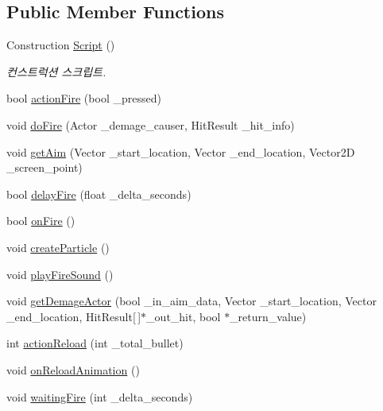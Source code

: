\subsection*{Public Member Functions}
\begin{DoxyCompactItemize}
\item 
Construction \hyperlink{class_weapons___actor_a47da85d09a9191edbee8f5454f8a5118}{Script} ()
\begin{DoxyCompactList}\small\item\em 컨스트럭션 스크립트. \end{DoxyCompactList}\item 
bool \hyperlink{class_weapons___actor_a386d7f1cdcdd6f989cbd91a4612094c9}{action\+Fire} (bool \+\_\+pressed)
\item 
void \hyperlink{class_weapons___actor_ab19a4d70050baea3347948f457b4316f}{do\+Fire} (Actor \+\_\+demage\+\_\+causer, Hit\+Result \+\_\+hit\+\_\+info)
\item 
void \hyperlink{class_weapons___actor_afeff0a9b2ae132677c1f268b305852f0}{get\+Aim} (Vector \+\_\+start\+\_\+location, Vector \+\_\+end\+\_\+location, Vector2D \+\_\+screen\+\_\+point)
\item 
bool \hyperlink{class_weapons___actor_a8fca2bbfe8830abe9feec1ee82565a1e}{delay\+Fire} (float \+\_\+delta\+\_\+seconds)
\item 
bool \hyperlink{class_weapons___actor_a222c02127cd7ec162e747a382bc3acb9}{on\+Fire} ()
\item 
void \hyperlink{class_weapons___actor_a89dec27e708d9944b1f4f17c5b6da210}{create\+Particle} ()
\item 
void \hyperlink{class_weapons___actor_a5452db7714a6fd6fc8d4e60387ca1484}{play\+Fire\+Sound} ()
\item 
void \hyperlink{class_weapons___actor_a62f4a9add9f4521b19f82e38777fcc85}{get\+Demage\+Actor} (bool \+\_\+in\+\_\+aim\+\_\+data, Vector \+\_\+start\+\_\+location, Vector \+\_\+end\+\_\+location, Hit\+Result\mbox{[}$\,$\mbox{]}$\ast$\+\_\+out\+\_\+hit, bool $\ast$\+\_\+return\+\_\+value)
\item 
int \hyperlink{class_weapons___actor_ab1b1e922088fe0747842df3599dbb7b3}{action\+Reload} (int \+\_\+total\+\_\+bullet)
\item 
void \hyperlink{class_weapons___actor_a8b36c9a754942e42e22601add407e257}{on\+Reload\+Animation} ()
\item 
void \hyperlink{class_weapons___actor_aad412298d60d3ffd391c1e3b925eb206}{waiting\+Fire} (int \+\_\+delta\+\_\+seconds)
\item 

\end{DoxyCompactItemize}
